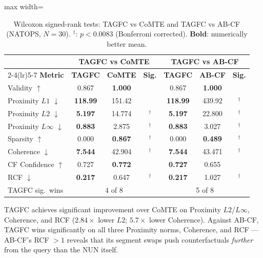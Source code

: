 \begin{table}[htbp]
\centering
\caption{Wilcoxon signed-rank tests: TAGFC vs CoMTE and TAGFC vs AB-CF (NATOPS, $N=30$). $^\dagger$: $p < 0.0083$ (Bonferroni corrected). \textbf{Bold}: numerically better mean.}
\label{tab:wilcoxon_combined}
\begin{adjustbox}{max width=\textwidth}
\begin{tabular}{lcccccc}
\toprule
& \multicolumn{3}{c}{\textbf{TAGFC vs CoMTE}} & \multicolumn{3}{c}{\textbf{TAGFC vs AB-CF}} \\
\cmidrule(lr){2-4}\cmidrule(lr){5-7}
\textbf{Metric} & \textbf{TAGFC} & \textbf{CoMTE} & \textbf{Sig.} & \textbf{TAGFC} & \textbf{AB-CF} & \textbf{Sig.} \\
\midrule
Validity $\uparrow$              & 0.867 & \textbf{1.000} &              & 0.867 & \textbf{1.000} & \\
Proximity $L1$ $\downarrow$      & \textbf{118.99} & 151.42 &              & \textbf{118.99} & 439.92 & $^\dagger$ \\
Proximity $L2$ $\downarrow$      & \textbf{5.197}  & 14.774 & $^\dagger$   & \textbf{5.197}  & 22.800 & $^\dagger$ \\
Proximity $L\infty$ $\downarrow$ & \textbf{0.883}  & 2.875  & $^\dagger$   & \textbf{0.883}  & 3.027  & $^\dagger$ \\
Sparsity $\uparrow$              & 0.000  & \textbf{0.867} & $^\dagger$   & 0.000  & \textbf{0.489} & $^\dagger$ \\
Coherence $\downarrow$           & \textbf{7.544}  & 42.904 & $^\dagger$   & \textbf{7.544}  & 43.471 & $^\dagger$ \\
CF Confidence $\uparrow$         & 0.727  & \textbf{0.772} &              & \textbf{0.727}  & 0.655  & \\
RCF $\downarrow$                 & \textbf{0.217}  & 0.647  & $^\dagger$   & \textbf{0.217}  & 1.027  & $^\dagger$ \\
\midrule
TAGFC sig.\ wins & \multicolumn{3}{c}{4 of 8} & \multicolumn{3}{c}{5 of 8} \\
\bottomrule
\end{tabular}
\end{adjustbox}
\end{table}

TAGFC achieves significant improvement over CoMTE on Proximity $L2$/$L\infty$, Coherence, and RCF ($2.84\times$ lower $L2$; $5.7\times$ lower Coherence). Against AB-CF, TAGFC wins significantly on all three Proximity norms, Coherence, and RCF — AB-CF's RCF $> 1$ reveals that its segment swaps push counterfactuals \emph{further} from the query than the NUN itself.

